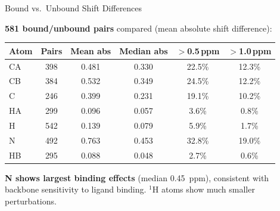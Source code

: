 \documentclass[aspectratio=169,11pt]{beamer}
\begin{document}
\begin{frame}[shrink=5]{Bound vs.\ Unbound Shift Differences}

\textbf{581 bound/unbound pairs} compared (mean absolute shift difference):

\medskip
\begin{center}
\footnotesize
\begin{tabular}{lccccc}
\toprule
\textbf{Atom} & \textbf{Pairs} & \textbf{Mean abs} & \textbf{Median abs} & \textbf{$>$0.5\,ppm} & \textbf{$>$1.0\,ppm} \\
\midrule
CA  & 398 & 0.481 & 0.330 & 22.5\% & 12.3\% \\
CB  & 384 & 0.532 & 0.349 & 24.5\% & 12.2\% \\
C   & 246 & 0.399 & 0.231 & 19.1\% & 10.2\% \\
HA  & 299 & 0.096 & 0.057 &  3.6\% &  0.8\% \\
H   & 542 & 0.139 & 0.079 &  5.9\% &  1.7\% \\
N   & 492 & 0.763 & 0.453 & 32.8\% & 19.0\% \\
HB  & 295 & 0.088 & 0.048 &  2.7\% &  0.6\% \\
\bottomrule
\end{tabular}
\end{center}

\medskip
\textbf{N shows largest binding effects} (median 0.45~ppm), consistent with backbone sensitivity to ligand binding. ${}^{1}$H atoms show much smaller perturbations.
\end{frame}
\end{document}
